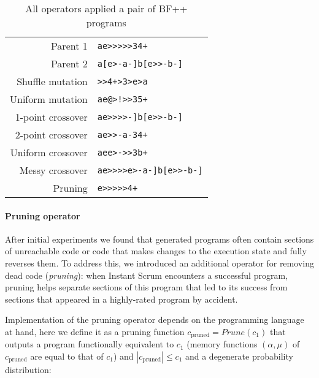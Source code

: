 \begin{table}
    \centering
    \begin{tabular}{r|l}
         Parent 1 & \color{blue}\verb|ae>>>>>34+| \\
         Parent 2 & \color{red}\verb|a[e>-a-]b[e>>-b-]| \\
         \midrule
         Shuffle mutation & \color{blue}\verb|>>4+>3>e>a| \\
         Uniform mutation & \color{blue}\verb|ae|\color{black}\verb|@|\color{blue}\verb|>|\color{black}\verb|!|\color{blue}\verb|>>3|\color{black}\verb|5|\color{blue}\verb|+| \\
         1-point crossover & \color{blue}\verb|ae>>>>|\color{red}\verb|-]b[e>>-b-]| \\
         2-point crossover & \color{blue}\verb|ae>|\color{red}\verb|>-a-|\color{blue}\verb|34+| \\
         Uniform crossover & \color{blue}\verb|ae|\color{red}\verb|e|\color{blue}\verb|>|\color{red}\verb|-|\color{blue}\verb|>>3|\color{red}\verb|b|\color{blue}\verb|+| \\
         Messy crossover & \color{blue}\verb|ae>>>>|\color{red}\verb|e>-a-]b[e>>-b-]| \\
         Pruning & \color{blue}\verb|e>>>>>4+| \\
    \end{tabular}
    \caption{All operators applied a pair of BF++ programs}
\end{table}


\paragraph{Pruning operator}

After initial experiments  we found that generated programs often contain sections of unreachable code or code that makes changes to the execution state and fully reverses them.
To address this, we introduced an additional operator for removing dead code (\emph{pruning}): when Instant Scrum encounters a successful program, pruning helps separate sections of this program that led to its success from sections that appeared in a highly-rated program by accident.  

Implementation of the pruning operator depends on the programming language at hand, here we define it as a pruning function $c_\text{pruned}=\mathit{Prune}(c_1)$ that outputs a program functionally equivalent to $c_1$ (memory functions $(\alpha,\mu)$ of $c_\text{pruned}$ are equal to that of $c_1$) and $|c_\text{pruned}| \leq c_1$ and a degenerate probability distribution:

